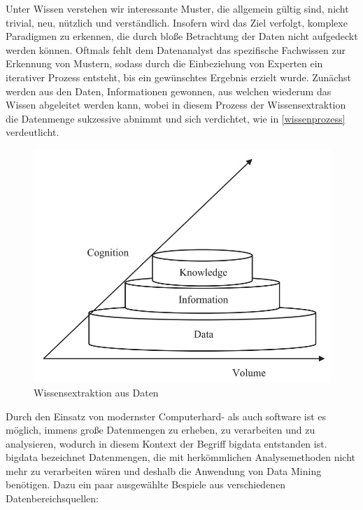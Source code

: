 \glqq Unter Wissen verstehen wir interessante Muster, die allgemein gültig sind, nicht trivial, neu, nützlich und verständlich.\grqq{} Insofern wird das Ziel verfolgt, komplexe Paradigmen zu erkennen, die durch bloße Betrachtung der Daten nicht aufgedeckt werden können. Oftmals fehlt dem Datenanalyst das spezifische Fachwissen zur Erkennung von Mustern, sodass durch die Einbeziehung von Experten ein iterativer Prozess entsteht, bis ein gewünschtes Ergebnis erzielt wurde. Zunächst werden aus den Daten, Informationen gewonnen, aus welchen wiederum das Wissen abgeleitet werden kann, wobei in diesem Prozess der Wissensextraktion die Datenmenge sukzessive abnimmt und sich verdichtet, wie in \vref{wissenprozess} verdeutlicht.

\begin{figure}[H]
\centering
\includegraphics[scale=1.3]{se-wa-jpg/wissenprozess}
\caption[Wissensextraktion aus Daten]{Wissensextraktion aus Daten\protect\footnotemark}
\label{wissenprozess}
\end{figure}


Durch den Einsatz von modernster Computerhard- als auch software ist es möglich, immens große Datenmengen zu erheben, zu verarbeiten und zu analysieren, wodurch in diesem Kontext der Begriff \gls{bigdata} entstanden ist. \gls{bigdata} bezeichnet Datenmengen, die mit herkömmlichen Analysemethoden nicht mehr zu verarbeiten wären und deshalb die Anwendung von Data Mining benötigen. Dazu ein paar ausgewählte Bespiele aus verschiedenen Datenbereichsquellen:

